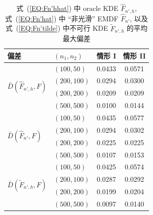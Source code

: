 \documentclass[a4paper,openay,14pt]{ctexbook}
\numberwithin{equation}{section}
\numberwithin{lem}{section}
\begin{document}
{
\setlength{\tabcolsep}{10pt}
\renewcommand{\arraystretch}{1.3}
\begin{table}[htbp]
    \centering
    \caption{式~(\ref{EQ:Fn'hhat}) 中 oracle KDE $\hat{F}_{n',h}$, 式~(\ref{EQ:Fn'hat}) 中 ``非光滑'' EMDF $\hat{F}_{n'}$, 以及式~(\ref{EQ:Fn'tilde}) 中不可行 KDE $\tilde{F}_{n',h}$ 的平均最大偏差
}
    \label{tab:Dbar}
    \begin{tabular}{llcc}
        \toprule
        偏差 & $(n_1,n_2)$ & 情形 I & 情形 II \\
        \midrule
        \multirow{4}{*}{$\bar{D}(\hat{F}_{n',h},F)$} 
            & $(100,50)$    & 0.0433 & 0.0571\\
            & $(200,100)$   & 0.0294 & 0.0300 \\
            & $(200,200)$   & 0.0209 & 0.0209 \\
            & $(500,500)$   & 0.0100 & 0.0144 \\
        \midrule
        \multirow{4}{*}{$\bar{D}(\hat{F}_{n'},F)$} 
            & $(100,50)$    & 0.0435 & 0.0577\\
            & $(200,100)$   & 0.0294 & 0.0302 \\
            & $(200,200)$   & 0.0225 & 0.0225 \\
            & $(500,500)$   & 0.0107 & 0.0153\\
        \midrule
        \multirow{4}{*}{$\bar{D}(\tilde{F}_{n',h},F)$} 
            & $(100,50)$    & 0.0425 & 0.0574 \\
            & $(200,100)$   & 0.0287 & 0.0292 \\
            & $(200,200)$   & 0.0199 & 0.0204 \\
            & $(500,500)$   & 0.0097 & 0.0140\\
        \bottomrule
    \end{tabular}
\end{table}
}
\end{document}
